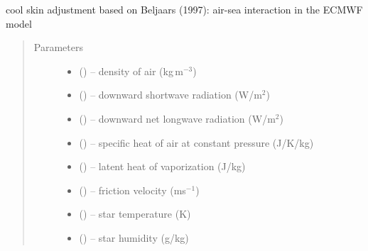 \documentclass[letterpaper,10pt,english]{sphinxmanual}
\begin{document}
\begin{fulllineitems}
\label{\detokenize{index:cs_wl_subs.cs_Beljaars}}
cool skin adjustment based on Beljaars (1997): air-sea interaction in the ECMWF model
\begin{quote}\begin{description}
\item[{Parameters}] \leavevmode\begin{itemize}
\item {} 
 (\href{https://docs.python.org/3/library/functions.html\#float}{}) -- density of air (kg\,m$^{-3}$)

\item {} 
 (\href{https://docs.python.org/3/library/functions.html\#float}{}) -- downward shortwave radiation (W/m$^2$)

\item {} 
 (\href{https://docs.python.org/3/library/functions.html\#float}{}) -- downward net longwave radiation (W/m$^2$)

\item {} 
 (\href{https://docs.python.org/3/library/functions.html\#float}{}) -- specific heat of air at constant pressure (J/K/kg)

\item {} 
 (\href{https://docs.python.org/3/library/functions.html\#float}{}) -- latent heat of vaporization (J/kg)

\item {} 
 (\href{https://docs.python.org/3/library/functions.html\#float}{}) -- friction velocity (ms$^{-1}$)

\item {} 
 (\href{https://docs.python.org/3/library/functions.html\#float}{}) -- star temperature (K)

\item {} 
 (\href{https://docs.python.org/3/library/functions.html\#float}{}) -- star humidity (g/kg)


\end{itemize}
\end{description}
\end{quote}
\end{fulllineitems}
\end{document}
